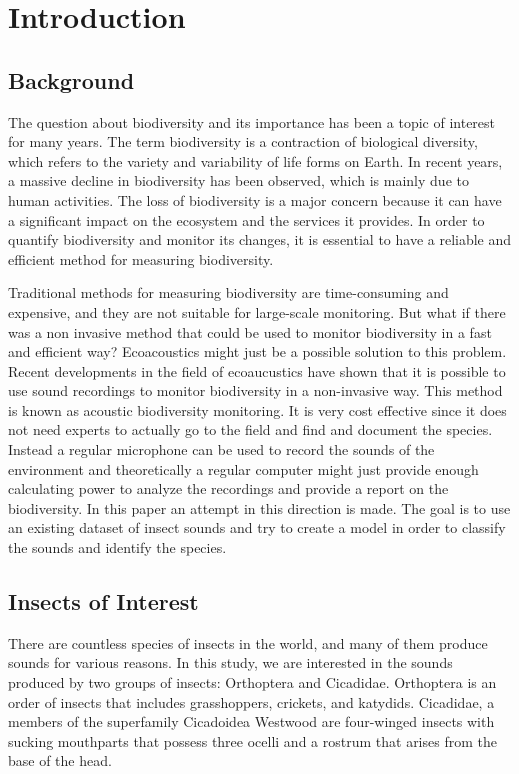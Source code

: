 

\section{Introduction}
\label{section1}

\subsection{Background}

The question about biodiversity and its importance has been a topic of interest for many years. 
The term biodiversity is a contraction of biological diversity, which refers to the variety and variability of life forms on Earth.
In recent years, a massive decline in biodiversity has been observed, which is mainly due to human activities.
The loss of biodiversity is a major concern because it can have a significant impact on the ecosystem and the services it provides.
In order to quantify biodiversity and monitor its changes, it is essential to have a reliable and efficient method for measuring biodiversity.

Traditional methods for measuring biodiversity are time-consuming and expensive, and they are not suitable for large-scale monitoring.
But what if there was a non invasive method that could be used to monitor biodiversity in a fast and efficient way?
Ecoacoustics might just be a possible solution to this problem. Recent developments in the field of ecoaucustics have
shown that it is possible to use sound recordings to monitor biodiversity in a non-invasive way. This method is known as 
acoustic biodiversity monitoring. It is very cost effective since it does not need experts to actually go to the field and
find and document the species. Instead a regular microphone can be used to record the sounds of the environment and theoretically
a regular computer might just provide enough calculating power to analyze the recordings and provide a report on the biodiversity.
In this paper an attempt in this direction is made. The goal is to use an existing dataset of insect sounds and try to create a model
in order to classify the sounds and identify the species.

\subsection{Insects of Interest}
There are countless species of insects in the world, and many of them produce sounds for various reasons.
In this study, we are interested in the sounds produced by two groups of insects: Orthoptera and Cicadidae.
Orthoptera is an order of insects that includes grasshoppers, crickets, and katydids. \autocite{capineraOrthoptera2008}
Cicadidae, a members of the superfamily Cicadoidea Westwood are four-winged insects with sucking 
mouthparts that possess three ocelli and a rostrum that arises from the base of the head. \autocite{sanbornCicadasHemipteraCicadoidea2008}

